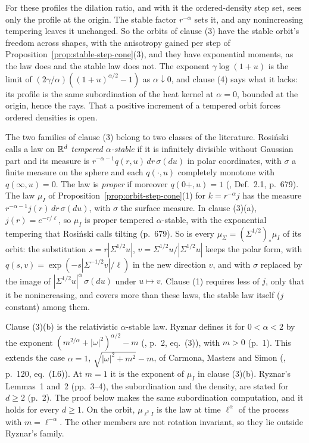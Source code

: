 For these profiles the dilation ratio, and with it the ordered-density step set, sees only the profile at
the origin. The stable factor $r^{-\alpha}$ sets it, and any nonincreasing tempering leaves it
unchanged. So the orbits
of clause (3) have the stable orbit's freedom across shapes, with the anisotropy gained per step of
Proposition~\ref{prop:stable-step-cone}(3), and they have exponential moments, as the \Matern{} law
does and the stable law does not. The \Matern{} exponent $\gamma\log(1 + u)$ is the limit of
$(2\gamma/\alpha)((1 + u)^{\alpha/2} - 1)$ as $\alpha \downarrow 0$, and clause (4) says what it lacks:
its profile is the same subordination of the heat kernel at $\alpha = 0$, bounded at the origin, hence
the rays. That a positive increment of a tempered orbit forces ordered densities is open.

The two families of clause (3) belong to two classes of the literature. Rosi\'nski calls a law on
$\mathbb{R}^d$ \emph{tempered $\alpha$-stable} if it is infinitely divisible without Gaussian part and its
\Levy{} measure is $r^{-\alpha-1}q(r,u)\,dr\,\sigma(du)$ in polar coordinates, with $\sigma$ a finite
measure on the sphere and each $q(\cdot,u)$ completely monotone with $q(\infty,u) = 0$. The law is
\emph{proper} if moreover $q(0{+},u) = 1$ (, Def.~2.1, p.~679). The law
$\mu_I$ of Proposition~\ref{prop:orbit-step-cone}(1) for $k = r^{-\alpha}j$ has the \Levy{} measure
$r^{-\alpha-1}j(r)\,dr\,\sigma(du)$, with $\sigma$ the surface measure. In clause (3)(a),
$j(r) = e^{-r/\ell}$, so $\mu_I$ is proper tempered $\alpha$-stable, with the exponential tempering that
Rosi\'nski calls tilting (p.~679). So is every $\mu_\Sigma = (\Sigma^{1/2})_*\mu_I$ of its orbit:
the substitution $s = r|\Sigma^{1/2}u|$, $v = \Sigma^{1/2}u/|\Sigma^{1/2}u|$ keeps the polar form,
with $q(s,v) = \exp(-s|\Sigma^{-1/2}v|/\ell)$ in the new direction $v$, and with $\sigma$ replaced by
the image of $|\Sigma^{1/2}u|^\alpha\,\sigma(du)$ under $u \mapsto v$. Clause (1) requires less of $j$, only that it be nonincreasing, and
covers more than these laws, the stable law itself ($j$ constant) among them.

Clause (3)(b) is the relativistic $\alpha$-stable law. Ryznar defines it for $0 < \alpha < 2$ by the
exponent $(m^{2/\alpha} + |\omega|^2)^{\alpha/2} - m$ (, p.~2, eq.~(3)),
with $m > 0$ (p.~1). This extends the case $\alpha = 1$, $\sqrt{|\omega|^2 + m^2} - m$, of Carmona,
Masters and Simon (, p.~120, eq.~(I.6)). At $m = 1$ it is the
exponent of $\mu_I$ in clause (3)(b). Ryznar's Lemmas~1 and~2 (pp.~3--4), the subordination and the
\Levy{} density, are stated for $d \ge 2$ (p.~2). The proof below makes the same subordination
computation, and it holds for every $d \ge 1$. On
the orbit, $\mu_{\ell^2I}$ is the law at time $\ell^\alpha$ of the process with $m = \ell^{-\alpha}$.
The other members are not rotation invariant, so they lie outside Ryznar's family.


